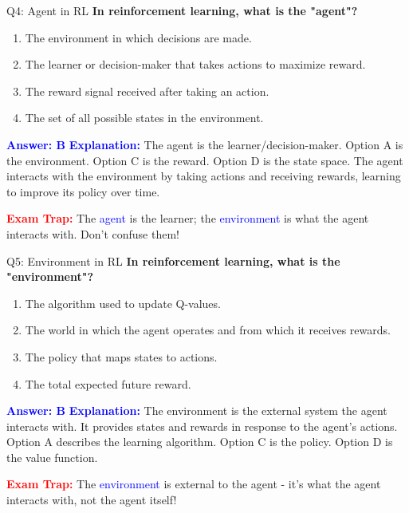 \documentclass[8pt]{beamer}
\begin{document}
	\begin{frame}{Q4: Agent in RL}
		\fontsize{6.5}{7.5}\selectfont
		\textbf{In reinforcement learning, what is the "agent"?}
		
		\begin{enumerate}
			\item The environment in which decisions are made.
			\item The learner or decision-maker that takes actions to maximize reward.
			\item The reward signal received after taking an action.
			\item The set of all possible states in the environment.
		\end{enumerate}
		
		\vspace{0.1cm}
		\textcolor{blue}{\textbf{Answer: B}}
		\vspace{0.1cm}
		\textcolor{blue}{\textbf{Explanation:}} The agent is the learner/decision-maker. Option A is the environment. Option C is the reward. Option D is the state space. The agent interacts with the environment by taking actions and receiving rewards, learning to improve its policy over time.
		
		\textcolor{red}{\textbf{Exam Trap:}} The \textcolor{blue}{agent} is the learner; the \textcolor{blue}{environment} is what the agent interacts with. Don't confuse them!
	\end{frame}
	
	\begin{frame}{Q5: Environment in RL}
		\fontsize{6.5}{7.5}\selectfont
		\textbf{In reinforcement learning, what is the "environment"?}
		
		\begin{enumerate}
			\item The algorithm used to update Q-values.
			\item The world in which the agent operates and from which it receives rewards.
			\item The policy that maps states to actions.
			\item The total expected future reward.
		\end{enumerate}
		
		\vspace{0.1cm}
		\textcolor{blue}{\textbf{Answer: B}}
		\vspace{0.1cm}
		\textcolor{blue}{\textbf{Explanation:}} The environment is the external system the agent interacts with. It provides states and rewards in response to the agent's actions. Option A describes the learning algorithm. Option C is the policy. Option D is the value function.
		
		\textcolor{red}{\textbf{Exam Trap:}} The \textcolor{blue}{environment} is external to the agent - it's what the agent interacts with, not the agent itself!
	\end{frame}
	
\end{document}
